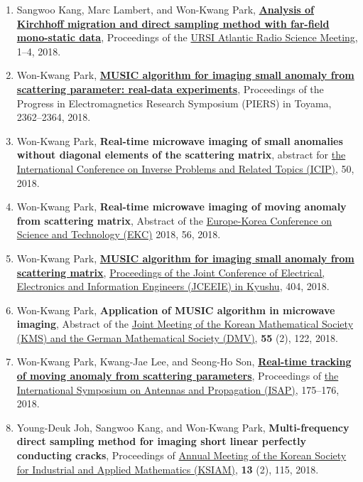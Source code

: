 \documentclass[10pt,A4]{article}
\begin{document}
\begin{enumerate}
\item\label{C-ATRASC2018} Sangwoo Kang, Marc Lambert, and Won-Kwang Park, \href{https://ieeexplore.ieee.org/document/8471469}{\textbf{Analysis of Kirchhoff migration and direct sampling method with far-field mono-static data}}, Proceedings of the \href{http://www.atrasc.com/homepage.php}{ URSI Atlantic Radio Science Meeting}, 1--4, 2018.
\item\label{C-PIERS2018} Won-Kwang Park, \href{https://doi.org/10.23919/PIERS.2018.8598183}{\textbf{MUSIC algorithm for imaging small anomaly from scattering parameter: real-data experiments}}, Proceedings of the Progress in Electromagnetics Research Symposium (PIERS) in Toyama, 2362--2364, 2018.
\item\label{C-ICIP2018} Won-Kwang Park, \textbf{Real-time microwave imaging of small anomalies without diagonal elements of the scattering matrix}, abstract for \href{https://www.ece.nus.edu.sg/stfpage/elechenx/Conference/index.htm}{the  International Conference on Inverse Problems and Related Topics (ICIP)}, 50, 2018.
\item\label{C-EKC2018} Won-Kwang Park, \textbf{Real-time microwave imaging of moving anomaly from scattering matrix}, Abstract of the \href{http://www.ekc2018.org/data/EKC2018-Proceedings.zip}{Europe-Korea Conference on Science and Technology (EKC)} 2018, 56, 2018.
\item\label{C-JCEEIE2018} Won-Kwang Park, \href{https://doi.org/10.11527/jceeek.2018.0_404}{\textbf{MUSIC algorithm for imaging small anomaly from scattering matrix}}, \href{https://www.jstage.jst.go.jp/browse/jceeek/2018/0/_contents/-char/en}{Proceedings of the  Joint Conference of Electrical, Electronics and Information Engineers (JCEEIE) in Kyushu}, 404, 2018.
\item\label{C-KMS2018} Won-Kwang Park, \textbf{Application of MUSIC algorithm in microwave imaging}, Abstract of the \href{http://www.kms.or.kr/KMS-DMV/}{Joint Meeting of the Korean Mathematical Society (KMS) and the German Mathematical Society (DMV)}, \textbf{55} (2), 122, 2018.
\item\label{C-ISAP2018} Won-Kwang Park, Kwang-Jae Lee, and Seong-Ho Son, \href{https://ieeexplore.ieee.org/document/8627499}{\textbf{Real-time tracking of moving anomaly from scattering parameters}}, Proceedings of \href{http://isap2018.org}{the International Symposium on Antennas and Propagation (ISAP)}, 175--176, 2018.
\item\label{C-KSIAM2018} Young-Deuk Joh, Sangwoo Kang, and Won-Kwang Park, \textbf{Multi-frequency direct sampling method for imaging short linear perfectly conducting cracks}, Proceedings of \href{https://www.ksiam.org/conference/3cbf86f3-4131-440b-a6f6-407c6c52edbf/welcome}{Annual Meeting of the Korean Society for Industrial and Applied Mathematics (KSIAM)}, \textbf{13} (2), 115, 2018.

\end{enumerate}
\end{document}
